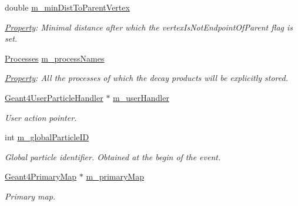 \begin{DoxyCompactItemize}
double \hyperlink{class_d_d4hep_1_1_simulation_1_1_geant4_particle_handler_ac60a7876123ba7481d080a4ef284a730}{m\_\-minDistToParentVertex}
\begin{DoxyCompactList}\small\item\em \hyperlink{class_d_d4hep_1_1_property}{Property}: Minimal distance after which the vertexIsNotEndpointOfParent flag is set. \item\end{DoxyCompactList}\item 
\hyperlink{class_d_d4hep_1_1_simulation_1_1_geant4_particle_handler_a80c1482fd25ec687f429854033ac3f79}{Processes} \hyperlink{class_d_d4hep_1_1_simulation_1_1_geant4_particle_handler_a86ffc05d00b981f7225c2cc6565e7739}{m\_\-processNames}
\begin{DoxyCompactList}\small\item\em \hyperlink{class_d_d4hep_1_1_property}{Property}: All the processes of which the decay products will be explicitly stored. \item\end{DoxyCompactList}\item 
\hyperlink{class_d_d4hep_1_1_simulation_1_1_geant4_user_particle_handler}{Geant4UserParticleHandler} $\ast$ \hyperlink{class_d_d4hep_1_1_simulation_1_1_geant4_particle_handler_a6614f131fd012f3e1aa7f13576baf256}{m\_\-userHandler}
\begin{DoxyCompactList}\small\item\em User action pointer. \item\end{DoxyCompactList}\item 
int \hyperlink{class_d_d4hep_1_1_simulation_1_1_geant4_particle_handler_a71f6aba6c3188b49fd16b63a3fff78a7}{m\_\-globalParticleID}
\begin{DoxyCompactList}\small\item\em Global particle identifier. Obtained at the begin of the event. \item\end{DoxyCompactList}\item 
\hyperlink{class_d_d4hep_1_1_simulation_1_1_geant4_primary_map}{Geant4PrimaryMap} $\ast$ \hyperlink{class_d_d4hep_1_1_simulation_1_1_geant4_particle_handler_a7b305cc199ec643d3014483dcc8a93b2}{m\_\-primaryMap}
\begin{DoxyCompactList}\small\item\em Primary map. \item\end{DoxyCompactList}\item 

\end{DoxyCompactItemize}
